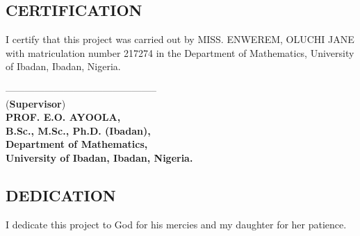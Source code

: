 \documentclass[a4 paper, 12pt]{report}
\theoremstyle{plain}
\begin{document}
\newpage
\begin{center}
	\section*{CERTIFICATION} 
\end{center}
I certify that this project was carried out by  MISS. ENWEREM, OLUCHI JANE with matriculation number 217274 in the Department of Mathematics, University of Ibadan, Ibadan, Nigeria.\\
\begin{center}
	-----------------------------------------------\\
	(\textbf{Supervisor})\\
	\textbf{PROF. E.O. AYOOLA,}\\
	\textbf{B.Sc., M.Sc., Ph.D. (Ibadan),}\\
	\textbf{Department of Mathematics,}\\
	\textbf{University of Ibadan, Ibadan, Nigeria.} 
\end{center}

\newpage
\begin{center}
	\section*{DEDICATION}
\end{center}
\noindent
\par I dedicate this project to God for his mercies and my daughter for her patience.%

\end{document}
